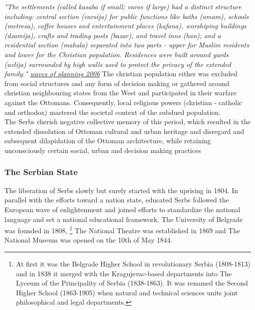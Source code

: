 \documentclass[11pt]{report}
\begin{document}
\textit{"The settlements (called kasaba  if  small;  varos  if  large)  had  a  distinct  structure  including:  central section (carsija) for public functions like baths (amam), schools (metresa), coffee houses and entertainment  places  (kafana),  worshiping  buildings  (dzamija),  crafts  and  trading  posts (bazar), and travel inns (han); and a residential section (mahala) separated into two parts - upper for Muslim residents and lower for the Christian population. Residences were built around yards (avlija) surrounded by high walls used to protect the privacy of the extended family." \href{ref}{waves of planning 2006}}
 The christian population either was excluded from social structures and any form of decision making or gathered around christian neighbouring states from the West and participated in their warfare against the Ottomans. Consequently, local religious powers (christian - catholic and orthodox) mastered the societal context of the subdued population.
\\

The Serbs cherish negative collective memory of this period, which resulted in the extended dissolution of Ottoman cultural and urban heritage and disregard and subsequent dilapidation of the Ottoman architecture, while retaining unconsciously certain social, urban and decision making practices \href{ref}{\citealt{blagojevic_urban_2009}}

\subsubsection{The Serbian State}

The liberation of Serbs slowly but surely started with the uprising in 1804.
In parallel with the efforts toward a nation state, educated Serbs followed the European wave of enlightenment and joined efforts to standardize the national language and set a national educational framework. The University of Belgrade was founded in 1808,
\footnote{At first it was the Belgrade Higher School in revolutionary Serbia (1808-1813) and in 1838 it merged with the Kragujevac-based departments into The Lyceum of the Principality of Serbia (1838-1863). It was renamed the Second Higher School (1863-1905) when natural and technical sciences units joint philosophical and legal departments.}
The National Theatre was established in 1869 and The National Museum was opened on the 10th of May 1844.
\\
\end{document}

